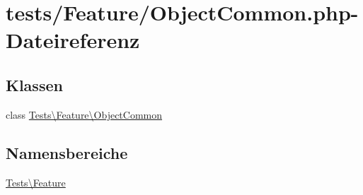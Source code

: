 \hypertarget{ObjectCommon_8php}{}\section{tests/\+Feature/\+Object\+Common.php-\/\+Dateireferenz}
\label{ObjectCommon_8php}
\subsection*{Klassen}
\begin{DoxyCompactItemize}
\item 
class \hyperlink{classTests_1_1Feature_1_1ObjectCommon}{Tests\textbackslash{}\+Feature\textbackslash{}\+Object\+Common}
\end{DoxyCompactItemize}
\subsection*{Namensbereiche}
\begin{DoxyCompactItemize}
\item 
 \hyperlink{namespaceTests_1_1Feature}{Tests\textbackslash{}\+Feature}
\end{DoxyCompactItemize}
